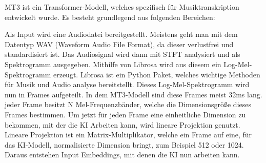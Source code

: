 MT3 ist ein Transformer-Modell, welches spezifisch für Musiktranskription entwickelt wurde.
Es besteht grundlegend aus folgenden Bereichen:
\begin{center}
    \vspace{1em}
    \vspace{1em}
\end{center}

Als Input wird eine Audiodatei bereitgestellt.
Meistens geht man mit dem Datentyp WAV (Waveform Audio File Format), da dieser verlustfrei und standardisiert ist.
Das Audiosignal wird dann mit STFT analysiert und als Spektrogramm ausgegeben.
Mithilfe von Librosa wird aus diesem ein Log-Mel-Spektrogramm erzeugt.
Librosa ist ein Python Paket, welches wichtige Methoden für Musik und Audio analyse bereitstellt.
Dieses Log-Mel-Spektrogramm wird nun in Frames aufgeteilt.
In dem MT3-Modell sind diese Frames meist 32ms lang.
jeder Frame besitzt N Mel-Frequenzbänder, welche die Dimensionsgröße dieses Frames bestimmen.
Um jetzt für jeden Frame eine einheitliche Dimension zu bekommen,
mit der die KI Arbeiten kann, wird lineare Projektion genutzt.
Lineare Projektion ist ein Matrix-Multiplikator, welche ein Frame auf eine,
für das KI-Modell, normalisierte Dimension bringt, zum Beispiel 512 oder 1024.
Daraus entstehen Input Embeddings, mit denen die KI nun arbeiten kann.

